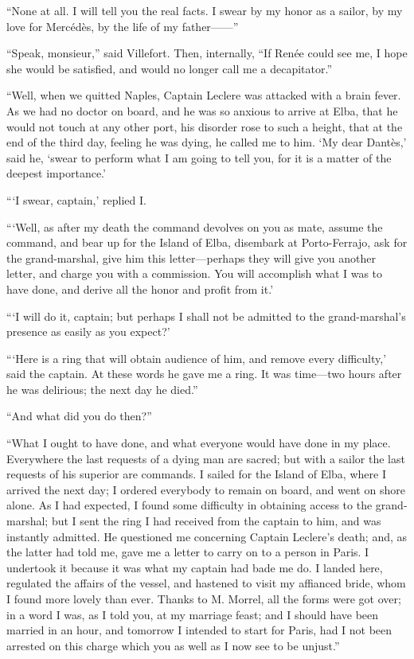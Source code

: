 “None at all. I will tell you the real facts. I swear by my honor as a
sailor, by my love for Mercédès, by the life of my father——”

“Speak, monsieur,” said Villefort. Then, internally, “If Renée could
see me, I hope she would be satisfied, and would no longer call me a
decapitator.”

“Well, when we quitted Naples, Captain Leclere was attacked with a
brain fever. As we had no doctor on board, and he was so anxious to
arrive at Elba, that he would not touch at any other port, his disorder
rose to such a height, that at the end of the third day, feeling he was
dying, he called me to him. ‘My dear Dantès,’ said he, ‘swear to
perform what I am going to tell you, for it is a matter of the deepest
importance.’

“‘I swear, captain,’ replied I.

“‘Well, as after my death the command devolves on you as mate, assume
the command, and bear up for the Island of Elba, disembark at
Porto-Ferrajo, ask for the grand-marshal, give him this letter—perhaps
they will give you another letter, and charge you with a commission.
You will accomplish what I was to have done, and derive all the honor
and profit from it.’

“‘I will do it, captain; but perhaps I shall not be admitted to the
grand-marshal’s presence as easily as you expect?’

“‘Here is a ring that will obtain audience of him, and remove every
difficulty,’ said the captain. At these words he gave me a ring. It was
time—two hours after he was delirious; the next day he died.”

“And what did you do then?”

“What I ought to have done, and what everyone would have done in my
place. Everywhere the last requests of a dying man are sacred; but with
a sailor the last requests of his superior are commands. I sailed for
the Island of Elba, where I arrived the next day; I ordered everybody
to remain on board, and went on shore alone. As I had expected, I found
some difficulty in obtaining access to the grand-marshal; but I sent
the ring I had received from the captain to him, and was instantly
admitted. He questioned me concerning Captain Leclere’s death; and, as
the latter had told me, gave me a letter to carry on to a person in
Paris. I undertook it because it was what my captain had bade me do. I
landed here, regulated the affairs of the vessel, and hastened to visit
my affianced bride, whom I found more lovely than ever. Thanks to M.
Morrel, all the forms were got over; in a word I was, as I told you, at
my marriage feast; and I should have been married in an hour, and
tomorrow I intended to start for Paris, had I not been arrested on this
charge which you as well as I now see to be unjust.”

